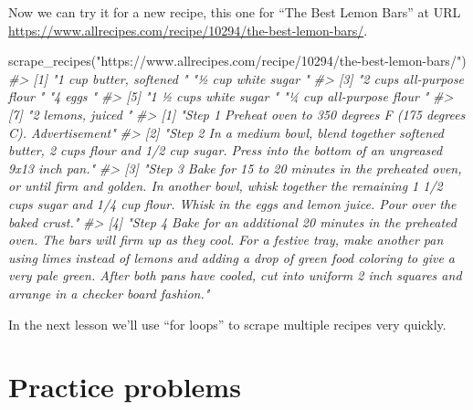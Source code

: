 \documentclass[
]{krantz}
\makeatletter
\newenvironment{Shaded}{\begin{snugshade}}{\end{snugshade}}
\newcommand{\CommentTok}[1]{\textcolor[rgb]{0.37,0.37,0.37}{\textit{#1}}}
\newcommand{\FunctionTok}[1]{\textcolor[rgb]{0,0,0}{#1}}
\newcommand{\NormalTok}[1]{#1}
\newcommand{\StringTok}[1]{\textcolor[rgb]{0.5,0.5,0.5}{#1}}
\newenvironment{kframe}{%
\medskip{}
\setlength{\fboxsep}{.8em}
 \def\at@end@of@kframe{}%
 \ifinner\ifhmode%
  \def\at@end@of@kframe{\end{minipage}}%
  \begin{minipage}{\columnwidth}%
 \fi\fi%
 \def\FrameCommand##1{\hskip\@totalleftmargin \hskip-\fboxsep
 \colorbox{shadecolor}{##1}\hskip-\fboxsep
     \hskip-\linewidth \hskip-\@totalleftmargin \hskip\columnwidth}%
 \MakeFramed {\advance\hsize-\width
   \@totalleftmargin\z@ \linewidth\hsize
   \@setminipage}}%
 {\par\unskip\endMakeFramed%
 \at@end@of@kframe}
\renewenvironment{Shaded}{\begin{kframe}}{\end{kframe}}
\makeatother
\begin{document}
Now we can try it for a new recipe, this one for ``The Best Lemon Bars'' at URL \url{https://www.allrecipes.com/recipe/10294/the-best-lemon-bars/}.

\begin{Shaded}
\begin{Highlighting}[]
\FunctionTok{scrape\_recipes}\NormalTok{(}\StringTok{"https://www.allrecipes.com/recipe/10294/the{-}best{-}lemon{-}bars/"}\NormalTok{)}
\CommentTok{\#\textgreater{} [1] "1 cup butter, softened "   "½ cup white sugar "       }
\CommentTok{\#\textgreater{} [3] "2 cups all{-}purpose flour " "4 eggs "                  }
\CommentTok{\#\textgreater{} [5] "1 ½ cups white sugar "     "¼ cup all{-}purpose flour " }
\CommentTok{\#\textgreater{} [7] "2 lemons, juiced "        }
\CommentTok{\#\textgreater{} [1] "Step 1   Preheat oven to 350 degrees F (175 degrees C).    Advertisement"                                                                                                                                                                                                                                                                         }
\CommentTok{\#\textgreater{} [2] "Step 2   In a medium bowl, blend together softened butter, 2 cups flour and 1/2 cup sugar. Press into the bottom of an ungreased 9x13 inch pan."                                                                                                                                                                                                  }
\CommentTok{\#\textgreater{} [3] "Step 3   Bake for 15 to 20 minutes in the preheated oven, or until firm and golden. In another bowl, whisk together the remaining 1 1/2 cups sugar and 1/4 cup flour. Whisk in the eggs and lemon juice. Pour over the baked crust."                                                                                                              }
\CommentTok{\#\textgreater{} [4] "Step 4   Bake for an additional 20 minutes in the preheated oven. The bars will firm up as they cool. For a festive tray, make another pan using limes instead of lemons and adding a drop of green food coloring to give a very pale green. After both pans have cooled, cut into uniform 2 inch squares and arrange in a checker board fashion."}
\end{Highlighting}
\end{Shaded}

In the next lesson we'll use ``for loops'' to scrape multiple recipes very quickly.

\hypertarget{practice-problems-14}{%
\section{Practice problems}\label{practice-problems-14}}
\end{document}
